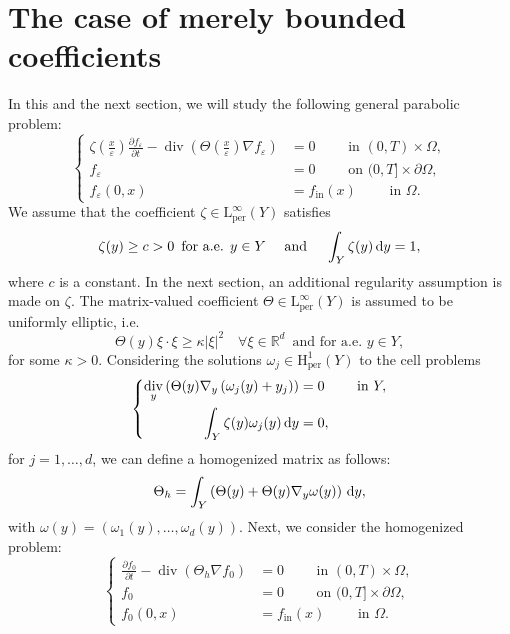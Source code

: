 \documentclass[preprint, 12pt]{amsart}
\numberwithin{equation}{section}
\numberwithin{equation}{section}
\newcommand\RR{\mathbb{R}}
\newcommand{\eps}{\varepsilon}
\DeclareMathOperator{\dv}{div}
\begin{document}
\section{The case of merely bounded coefficients}\label{sec:2}
In this and the next section, we will study the following general parabolic problem:
\begin{equation}\label{eq:equation-for-feps}
\left\{
\begin{aligned}
\zeta\left(\frac{x}{\eps}\right)\frac{\partial f_{\varepsilon}}{\partial t} - \dv\left(\Theta\left(\frac{x}{\eps}\right)\nabla f_{\varepsilon}\right) & =  0 \qquad \mbox{ in }(0,T)\times \Omega,
\\
f_\eps & = 0 \qquad \mbox{ on } (0,T]\times \partial \Omega,
\\
f_\eps(0,x) & = f_{\text{in}}(x) \qquad \mbox{ in } \Omega.
\end{aligned}
\right.
\end{equation}
We assume that the coefficient $\zeta\in\mathrm L^{\infty}_{\text{per}}(Y)$ satisfies
\begin{equation}\label{eq:zeta-average-1}
\zeta(y) \ge c >0 \, \mbox{ for a.e. }y\in Y
\quad\mbox{ and }\quad
\int_Y \zeta(y)\, {\rm d}y = 1,
\end{equation}
where $c$ is a constant. In the next section, an additional regularity assumption is made on $\zeta$. The matrix-valued coefficient $\Theta\in\mathrm L^\infty_{\text{per}}(Y)$ is assumed to be uniformly elliptic, i.e.
\[
\Theta(y)\xi\cdot\xi \ge \kappa \left\vert \xi\right\vert^2 \quad \forall \xi\in\RR^d \, \mbox{ and for a.e. }y\in Y,
\]
for some $\kappa>0$. Considering the solutions $\omega_j\in \mathrm H^1_{\text{per}}(Y)$ to the cell problems
\begin{equation}\label{eq:cellpb-Theta}
\left\{
\begin{aligned}
\dv_y\left(\Theta(y)\nabla_y \left( \omega_j(y) + y_j \right)\right) & = 0 \qquad \mbox{ in }Y,
\\
\int_Y \zeta(y)\omega_j(y) \, {\rm d} y & = 0,
\end{aligned}\right.
\end{equation}
for $j=1,\dots,d$, we can define a homogenized matrix as follows:
\[
\Theta_h = \int_Y \left( \Theta(y) + \Theta(y) \nabla_y \omega(y) \right)\, {\rm d}y,
\]
with $\omega(y) = \left( \omega_1(y), \dots, \omega_d(y) \right)$. Next, we consider the homogenized problem:
\begin{equation}\label{eq:homogeneqn-f0}
\left\{
\begin{aligned}
\frac{\partial f_0}{\partial t} - \dv\left(\Theta_h\nabla f_0\right) & =  0 \qquad \mbox{ in }(0,T)\times \Omega,
\\
f_0 & = 0 \qquad \mbox{ on } (0,T]\times \partial \Omega,
\\
f_0(0,x) & = f_{\text{in}}(x) \qquad \mbox{ in } \Omega.
\end{aligned}\right.
\end{equation}
\end{document}
